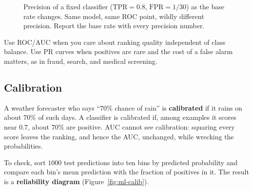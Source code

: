 \begin{figure}[H]
\centering
{}
\caption{Precision of a fixed classifier ($\text{TPR}=0.8$, $\text{FPR}=1/30$) as the base rate
changes. Same model, same ROC point, wildly different precision. Report the base rate with
every precision number.}
\label{fig:ml-baserate}
\end{figure}

Use ROC/AUC when you care about ranking quality independent of class balance. Use PR curves
when positives are rare and the cost of a false alarm matters, as in fraud, search, and
medical screening.

\subsection{Calibration}

A weather forecaster who says ``$70\%$ chance of rain'' is \textbf{calibrated} if it rains on
about $70\%$ of such days. A classifier is calibrated if, among examples it scores near $0.7$,
about $70\%$ are positive. AUC cannot see calibration: squaring every score leaves the ranking,
and hence the AUC, unchanged, while wrecking the probabilities.

To check, sort $1000$ test predictions into ten bins by predicted probability and compare each
bin's mean prediction with the fraction of positives in it. The result is a
\textbf{reliability diagram} (Figure~\ref{fig:ml-calib}).

